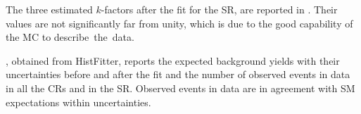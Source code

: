 The three estimated $k$-factors after the fit for the SR, are reported in \Tab{\ref{tab:kfactors}}. Their values are not significantly far from unity, which is due to the good capability of the MC to \mbox{describe the data}.

\Tab{\ref{table.results.systematics.in.logL.fit.table.results.yields}}, obtained from HistFitter, reports the expected background yields with their uncertainties before and after the fit and the number of observed events in data in all the CRs and in the SR. Observed events in data are in agreement with SM expectations within uncertainties.










